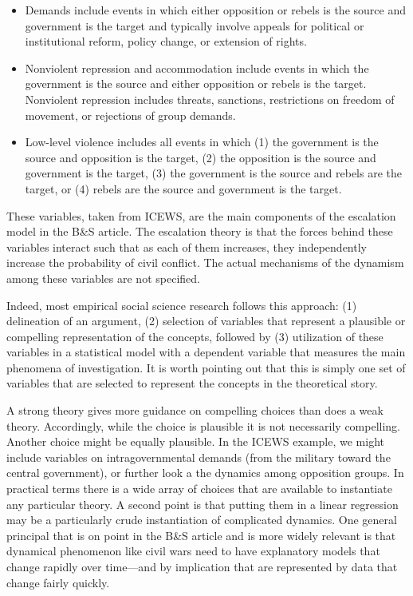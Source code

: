 \documentclass[
]{article}
\begin{document}
\begin{itemize}
\item Demands include events in which either opposition or rebels is the source and government is the target and typically involve appeals for political or institutional reform, policy change, or extension of rights.
\item Nonviolent repression and accommodation include events in which the government is the source and either opposition or rebels is the target. Nonviolent repression includes threats, sanctions, restrictions on freedom of movement, or rejections of group demands.
\item Low-level violence includes all events in which (1) the government is the source and opposition is the target, (2) the opposition is the source and government is the target, (3) the government is the source and rebels are the target, or (4) rebels are the source and government is the target.
\end{itemize}

These variables, taken from ICEWS, are the main components of the escalation model in the B\&S article. The escalation theory is that the forces behind these variables interact such that as each of them increases, they independently increase the probability of civil conflict. The actual mechanisms of the dynamism among these variables are not specified.

Indeed, most empirical social science research follows this approach: (1) delineation of an argument, (2) selection of variables that represent a plausible or compelling representation of the concepts, followed by (3) utilization of these variables in a statistical model with a dependent variable that measures the main phenomena of investigation. It is worth pointing out that this is simply one set of variables that are selected to represent the concepts in the theoretical story.

A strong theory gives more guidance on compelling choices than does a weak theory. Accordingly, while the choice is plausible it is not necessarily compelling. Another choice might be equally plausible. In the ICEWS example, we might include variables on intragovernmental demands (from the military toward the central government), or further look a the dynamics among opposition groups. In practical terms there is a wide array of choices that are available to instantiate any particular theory. A second point is that putting them in a linear regression may be a particularly crude instantiation of complicated dynamics. One general principal that is on point in the B\&S article and is more widely relevant is that dynamical phenomenon like civil wars need to have explanatory models that change rapidly over time---and by implication that are represented by data that change fairly quickly.
\end{document}
